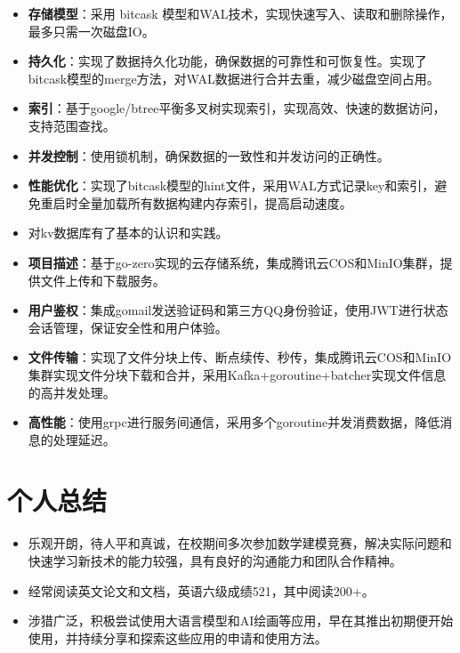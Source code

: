 \documentclass{resume}
\begin{document}
\begin{itemize}
    \item \textbf{存储模型}：采用 bitcask 模型和WAL技术，实现快速写入、读取和删除操作，最多只需一次磁盘IO。
    \item \textbf{持久化}：实现了数据持久化功能，确保数据的可靠性和可恢复性。实现了bitcask模型的merge方法，对WAL数据进行合并去重，减少磁盘空间占用。
    \item \textbf{索引}：基于google/btree平衡多叉树实现索引，实现高效、快速的数据访问，支持范围查找。
    \item \textbf{并发控制}：使用锁机制，确保数据的一致性和并发访问的正确性。
    \item \textbf{性能优化}：实现了bitcask模型的hint文件，采用WAL方式记录key和索引，避免重启时全量加载所有数据构建内存索引，提高启动速度。
    \item 对kv数据库有了基本的认识和实践。
\end{itemize}

\begin{itemize}
    \item \textbf{项目描述}：基于go-zero实现的云存储系统，集成腾讯云COS和MinIO集群，提供文件上传和下载服务。
    \item \textbf{用户鉴权}：集成gomail发送验证码和第三方QQ身份验证，使用JWT进行状态会话管理，保证安全性和用户体验。
    \item \textbf{文件传输}：实现了文件分块上传、断点续传、秒传，集成腾讯云COS和MinIO集群实现文件分块下载和合并，采用Kafka+goroutine+batcher实现文件信息的高并发处理。
    \item \textbf{高性能}：使用grpc进行服务间通信，采用多个goroutine并发消费数据，降低消息的处理延迟。
\end{itemize}

\section{个人总结}
\begin{itemize}
  \item 乐观开朗，待人平和真诚，在校期间多次参加数学建模竞赛，解决实际问题和快速学习新技术的能力较强，具有良好的沟通能力和团队合作精神。
  \item 经常阅读英文论文和文档，英语六级成绩521，其中阅读200+。
  \item 涉猎广泛，积极尝试使用大语言模型和AI绘画等应用，早在其推出初期便开始使用，并持续分享和探索这些应用的申请和使用方法。
\end{itemize}
\end{document}
